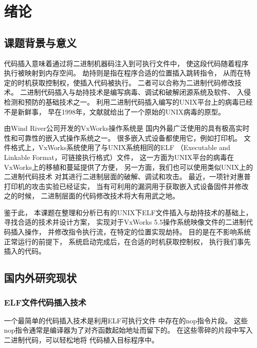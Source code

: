 \chapter{绪论}

\section{课题背景与意义}

代码插入意味着通过将二进制机器码注入到可执行文件中，
使这段代码随着程序执行被映射到内存空间。
劫持则是指在程序合适的位置插入跳转指令，
从而在特定的时机获取控制权，使插入代码被执行。
二者可以合称为二进制代码修改技术。
二进制代码插入与劫持技术是编写病毒、调试和破解闭源系统及软件、
入侵检测和预防的基础技术之一。
利用二进制代码插入编写的UNIX平台上的病毒已经不是新鲜事，
早在1998年，文献\cite{silvio}就给出了一个原始的UNIX病毒的原型。

由Wind River公司开发的VxWorks操作系统是
国内外最广泛使用的具有极高实时性和可靠性的嵌入式操作系统之一。
很多嵌入式设备都使用它，例如打印机。
文件格式上，VxWorks系统使用了与UNIX系统相同的ELF
（Executable and Linkable Format，可链接执行格式）文件，
这一方面为UNIX平台的病毒在VxWorks上的移植和蔓延提供了方便，
另一方面，我们也可以使用类似UNIX上的二进制代码技术
对其进行二进制层面的破解、调试和攻击。
最近，一项针对惠普打印机的攻击实验已经证实，
当有可利用的漏洞用于获取嵌入式设备固件并修改之的时候，
二进制层面的代码修改技术将大有用武之地。


鉴于此，
本课题在整理和分析已有的UNIX下ELF文件插入与劫持技术的基础上，
寻找合适的技术并设计方案，
实现对于VxWorks 5.5操作系统映像文件的二进制代码插入操作，
并修改指令执行流，在特定的位置实现劫持。
目的是在不影响系统正常运行的前提下，
系统启动完成后，在合适的时机获取控制权，
执行我们事先插入的代码。

\section{国内外研究现状}

\subsection{ELF文件代码插入技术}

一个最简单的代码插入技术是利用ELF可执行文件
中存在的nop指令片段。
这些nop指令通常是编译器为了对齐函数起始地址而留下的。
在这些零碎的片段中写入二进制代码，可以轻松地将
代码植入目标程序中。

